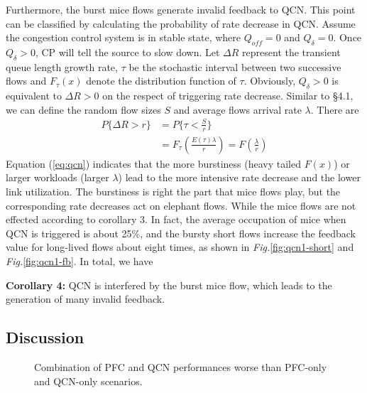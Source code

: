 \documentclass[]{sig-alternate-10pt}
\begin{document}
Furthermore, the burst mice flows generate invalid feedback to QCN. This point can be classified by calculating the probability of rate decrease in QCN. 
Assume the congestion control system is in stable state, where $Q_{off}=0$ and $Q_\delta=0$. Once $Q_\delta >0$, CP will tell the source to slow down. Let $\Delta R$ represent the transient queue length growth rate, $\tau$ be the stochastic interval between two successive flows and $F_\tau(x)$ denote the distribution function of $\tau$.
Obviously, $Q_\delta>0$ is equivalent to $\Delta R>0$ on the respect of triggering rate decrease. 
Similar to \S4.1, we can define the random flow sizes $S$ and average flows arrival rate $\lambda$. 
There are
\begin{equation}
\begin{array}{cl}
	P\{\Delta R>r\}&=P\{\tau <\frac{S}{r}\} \\[5pt]
	& =F_\tau\left(\frac{E(\tau)\lambda}{r}\right)=F\left(\frac{\lambda}{r}\right)
\end{array}
\label{eq:qcn}
\end{equation}
Equation (\ref{eq:qcn}) indicates that the more burstiness (heavy tailed $F(x)$) or larger workloads (larger $\lambda$) lead to the more intensive rate decrease and the lower link utilization. 
The burstiness is right the part that mice flows play, but the corresponding rate decreases act on elephant flows.
While the mice flows are not effected according to corollary 3.
In fact, the average occupation of mice when QCN is triggered is about 25\%, and the bursty short flows increase the feedback value for long-lived flows about eight times, as shown in \emph{Fig.}\ref{fig:qcn1-short} and \emph{Fig.}\ref{fig:qcn1-fb}.
In total, we have

\noindent\textbf{Corollary 4:}
QCN is interfered by the burst mice flow, which leads to the generation of many invalid feedback.









\subsection{Discussion}
\begin{figure}[t]
	\centering
	\hfill
	\caption{Combination of PFC and QCN performances worse than PFC-only and  QCN-only scenarios.}
	\label{fig:worse}
\end{figure}
\end{document}
